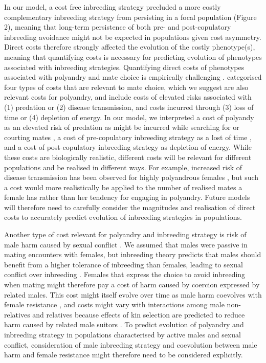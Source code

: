 \documentclass[10pt,letterpaper]{article}
\begin{document}
In our model, a cost free inbreeding strategy precluded a more costly complementary inbreeding strategy from persisting in a focal population (Figure 2), meaning that long-term persistence of both pre- and post-copulatory inbreeding avoidance might not be expected in populations given cost asymmetry. Direct costs therefore strongly affected the evolution of the costly phenotype(s), meaning that quantifying costs is necessary for predicting evolution of phenotypes associated with inbreeding strategies. Quantifying direct costs of phenotypes associated with polyandry and mate choice is empirically challenging \cite[][]{Pomiankowski1987, Kokko2003, Reid2015}. \cite{Pomiankowski1987} categorised four types of costs that are relevant to mate choice, which we suggest are also relevant costs for polyandry, and include costs of elevated risks associated with (1) predation or (2) disease transmission, and costs incurred through (3) loss of time or (4) depletion of energy. In our model, we interpreted a cost of polyandy as an elevated risk of predation as might be incurred while searching for or courting mates \cite[e.g.,][]{Rowe1988, Rowe1994}, a cost of pre-copulatory inbreeding strategy as a lost of time \cite[i.e., risk of not finding a mate in time due to choosiness; e.g.,][]{Kokko2013}, and a cost of post-copulatory inbreeding strategy as depletion of energy. While these costs are biologically realistic, different costs will be relevant for different populations and be realised in different ways. For example, increased risk of disease transmission has been observed for highly polyandrous females \cite[][]{Roberts2015a}, but such a cost would more realistically be applied to the number of realised mates a female has rather than her tendency for engaging in polyandry. Future models will therefore need to carefully consider the magnitudes and realisation of direct costs to accurately predict evolution of inbreeding strategies in populations. 

Another type of cost relevant for polyandry and inbreeding strategy is risk of male harm caused by sexual conflict \cite[e.g.,][]{Arnqvist2005a, Parker2006}. We assumed that males were passive in mating encounters with females, but inbreeding theory predicts that males should benefit from a higher tolerance of inbreeding than females, leading to sexual conflict over inbreeding \cite[][]{Parker1979, Parker2006, Kokko2006, Duthie2015a}. Females that express the choice to avoid inbreeding when mating might therefore pay a cost of harm caused by coercion expressed by related males. This cost might itself evolve over time as male harm coevolves with female resistance \cite[][]{Ronn2007, Perry2011, Wang2015a}, and costs might vary with interactions among male non-relatives and relatives because effects of kin selection are predicted to reduce harm caused by related male suitors \cite[][]{Rankin2011a}. To predict evolution of polyandry and inbreeding strategy in populations characterised by active males and sexual conflict, consideration of male inbreeding strategy and coevolution between male harm and female resistance might therefore need to be considered explicitly. 
\end{document}
